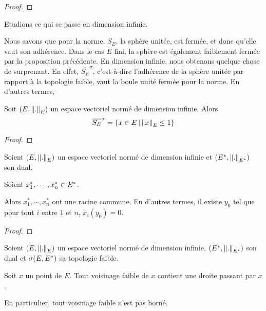 \ifdefined\outputproof
\begin{proof}

\end{proof}
\fi

Etudions ce qui se passe en dimension infinie.

Nous savons que pour la norme, $S_{E}$, la sphère unitée, est fermée, et donc
qu'elle vaut son adhérence.  Dans le cas $E$ fini, la sphère est également
faiblement fermée par la proposition précédente. En dimension infinie, nous
obtenons quelque chose de surprenant. En effet, $\overline{S_{E}}^{\sigma}$,
c'est-à-dire l'adhérence de la sphère unitée par rapport à la topologie faible,
vaut la boule unité fermée pour la norme.
En d'autres termes,

\begin{proposition}
	Soit $(E, \norm{.}_{E})$ un espace vectoriel normé de
	dimension infinie. Alors
	\begin{equation}
		\overline{S_{E}}^{\sigma} = \left\{x \in E \, | \, \norm{x}_{E} \leq 1 \right\}
	\end{equation}
\end{proposition}

\ifdefined\outputproof
\begin{proof}

\end{proof}
\fi

\begin{lemma}
	Soient $(E, \norm{.}_{E})$ un espace vectoriel normé de
	dimension infinie et
	$(E^{*}, \norm{.}_{E^{*}})$ son dual.

	Soient $x_{1}^{*}, \cdots, x_{n}^{*} \in E^{*}$.

	Alors $x_{1}^{*}, \cdots, x_{n}^{*}$ ont une racine commune. En d'autres
	termes, il existe $y_{0}$ tel que pour tout $i$ entre $1$ et $n$,
	$x_{i}(y_{0}) = 0$.
\end{lemma}

\ifdefined\outputproof
\begin{proof}

\end{proof}
\fi

\begin{lemma}
	Soient $(E, \norm{.}_{E})$ un espace vectoriel normé de
	dimension infinie, $(E^{*}, \norm{.}_{E^{*}})$
	son dual et $\sigma(E, E^{*})$ sa topologie faible.

	Soit $x$ un point de $E$.
	Tout voisinage faible de $x$ contient une droite passant par $x$.

	En particulier, tout voisinage faible n'est pas borné.
\end{lemma}


